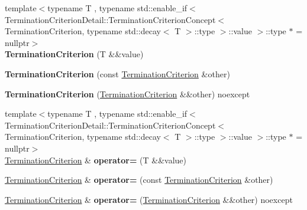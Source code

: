\begin{DoxyCompactItemize}
\item 
{\footnotesize template$<$typename T , typename std\+::enable\+\_\+if$<$ Termination\+Criterion\+Detail\+::\+Termination\+Criterion\+Concept$<$ Termination\+Criterion, typename std\+::decay$<$ T $>$\+::type $>$\+::value $>$\+::type $\ast$  = nullptr$>$ }\\{\bfseries Termination\+Criterion} (T \&\&value)\hypertarget{classSpacy_1_1CG_1_1TerminationCriterion_a802fa06abd50e597332969cbd7d39bc5}{}\label{classSpacy_1_1CG_1_1TerminationCriterion_a802fa06abd50e597332969cbd7d39bc5}

\item 
{\bfseries Termination\+Criterion} (const \hyperlink{classSpacy_1_1CG_1_1TerminationCriterion}{Termination\+Criterion} \&other)\hypertarget{classSpacy_1_1CG_1_1TerminationCriterion_a84ed627e669d2eecef2624fc5a63c457}{}\label{classSpacy_1_1CG_1_1TerminationCriterion_a84ed627e669d2eecef2624fc5a63c457}

\item 
{\bfseries Termination\+Criterion} (\hyperlink{classSpacy_1_1CG_1_1TerminationCriterion}{Termination\+Criterion} \&\&other) noexcept\hypertarget{classSpacy_1_1CG_1_1TerminationCriterion_aebcda59709577698d88bb01fe81dd470}{}\label{classSpacy_1_1CG_1_1TerminationCriterion_aebcda59709577698d88bb01fe81dd470}

\item 
{\footnotesize template$<$typename T , typename std\+::enable\+\_\+if$<$ Termination\+Criterion\+Detail\+::\+Termination\+Criterion\+Concept$<$ Termination\+Criterion, typename std\+::decay$<$ T $>$\+::type $>$\+::value $>$\+::type $\ast$  = nullptr$>$ }\\\hyperlink{classSpacy_1_1CG_1_1TerminationCriterion}{Termination\+Criterion} \& {\bfseries operator=} (T \&\&value)\hypertarget{classSpacy_1_1CG_1_1TerminationCriterion_ac0f2c2ed8e6cb00861ae1131eb2eb3a2}{}\label{classSpacy_1_1CG_1_1TerminationCriterion_ac0f2c2ed8e6cb00861ae1131eb2eb3a2}

\item 
\hyperlink{classSpacy_1_1CG_1_1TerminationCriterion}{Termination\+Criterion} \& {\bfseries operator=} (const \hyperlink{classSpacy_1_1CG_1_1TerminationCriterion}{Termination\+Criterion} \&other)\hypertarget{classSpacy_1_1CG_1_1TerminationCriterion_a5f1b681ad585c508dd3a71b4f24eea6d}{}\label{classSpacy_1_1CG_1_1TerminationCriterion_a5f1b681ad585c508dd3a71b4f24eea6d}

\item 
\hyperlink{classSpacy_1_1CG_1_1TerminationCriterion}{Termination\+Criterion} \& {\bfseries operator=} (\hyperlink{classSpacy_1_1CG_1_1TerminationCriterion}{Termination\+Criterion} \&\&other) noexcept\hypertarget{classSpacy_1_1CG_1_1TerminationCriterion_ad39a2f9dfcdd4f870d10619f36cafe74}{}\label{classSpacy_1_1CG_1_1TerminationCriterion_ad39a2f9dfcdd4f870d10619f36cafe74}


\end{DoxyCompactItemize}
